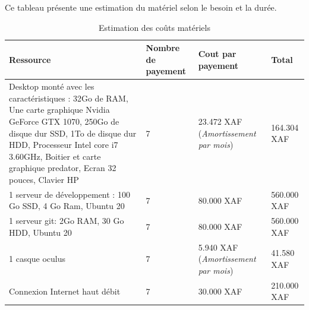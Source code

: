 Ce tableau présente une estimation du matériel selon le besoin et la durée.

\begin{table}[H]
	\caption{Estimation des coûts matériels}

	\begin{tabular}{ |p{7cm}|p{2cm}|p{3cm}|p{3cm}| }
		\hline
		\textbf{Ressource}                                                                                                                                                                                                                                     & \textbf{Nombre de payement} & \textbf{Cout par payement}                   & \textbf{Total} \\
		\hline
		Desktop monté avec les caractéristiques : 32Go de RAM, Une carte graphique Nvidia GeForce GTX 1070, 250Go de disque dur SSD, 1To de disque dur HDD, Processeur Intel core i7 3.60GHz, Boitier et carte graphique predator, Ecran 32 pouces, Clavier HP & 7                           & 23.472 XAF (\textit{Amortissement par mois}) & 164.304 XAF    \\
		\hline
		1 serveur de développement : 100 Go SSD, 4 Go Ram, Ubuntu 20                                                                                                                                                                                           & 7                           & 80.000 XAF                                   & 560.000 XAF    \\
		\hline
		1 serveur git: 2Go RAM, 30 Go HDD, Ubuntu 20                                                                                                                                                                                                           & 7                           & 80.000 XAF                                   & 560.000 XAF    \\
		\hline
		1 casque oculus                                                                                                                                                                                                                                        & 7                           & 5.940 XAF (\textit{Amortissement par mois})  & 41.580 XAF     \\
		\hline
		Connexion Internet haut débit                                                                                                                                                                                                                          & 7                           & 30.000 XAF                                   & 210.000 XAF    \\

\end{tabular}
\end{table}
